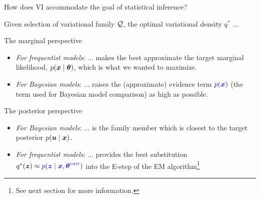 \documentclass[10pt]{beamer}
\begin{document}
\begin{frame}{How does VI accommodate the goal of statistical inference?}

Given selection of variational family $\mathcal{Q}$, the optimal variational density $q^*$ ...

\begin{block}{The marginal perspective}

\begin{itemize}


\item \textit{For frequentist models}: ... makes the \VLBO best approximate the  \alert{target marginal likelihood, $p({\boldsymbol x} \; | \; {\boldsymbol \theta})$}, which is what we wanted to maximize.
\item \textit{For Bayesian models}: ... raises the (approximate) evidence term $\color{blue}{p(\ensuremath{{\boldsymbol x}})} \color{black}$ (the term used for Bayesian model comparison) as high as possible. %
\end{itemize}

\end{block} 


\begin{block}{The posterior perspective}

\begin{itemize}
\item \textit{For Bayesian models}:  ...  is the family member which is closest to the\alert{ target  posterior $p({\boldsymbol u} \; | \; {\boldsymbol x})$}.
\item \textit{For frequentist models}: ... provides the best substitution $q^*({\boldsymbol z}) \approx \color{blue}{p(\ensuremath{{\boldsymbol z}}\; | \;\ensuremath{{\boldsymbol x}}, \ensuremath{{\boldsymbol \theta}}^{\text{curr}})} \color{black}$ into the E-step of the EM algorithm\footnote{See next section for more information.}
\end{itemize}

\end{block} 
\end{frame}
\end{document}
